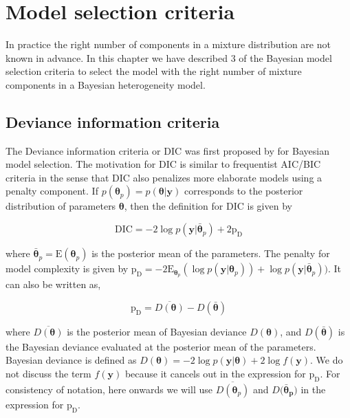 \chapter{Model selection criteria}
\label{ch : model_selection}

In practice the right number of components in a mixture distribution are not known in advance. In this chapter we have described 3 of the Bayesian model selection criteria to select the model with the right number of mixture components in a Bayesian heterogeneity model.

\section{Deviance information criteria}
\label{sec : dic}

The Deviance information criteria or DIC was first proposed by \citet{spiegelhalter_bayesian_2002} for Bayesian model selection. The motivation for DIC is similar to frequentist AIC/BIC criteria in the sense that DIC also penalizes more elaborate models using a penalty component. If $p(\boldsymbol{\theta}_p) = p(\boldsymbol{\theta}|\boldsymbol{y})$ corresponds to the posterior distribution of parameters $\boldsymbol{\theta}$, then the definition for DIC is given by 

$$\text{DIC} = -2\log{p(\boldsymbol{y}|\boldsymbol{\bar{\theta}}_p)} + 2\text{p}_\text{D}$$

where $\boldsymbol{\bar{\theta}}_p = \text{E}(\boldsymbol{\theta}_p)$ is the posterior mean of the parameters. The penalty for model complexity is given by 
$\text{p}_\text{D} = -2\text{E}_{\boldsymbol{\theta}_p}(\log{p(\boldsymbol{y}|\boldsymbol{\theta}_p)}) + \log{p(\boldsymbol{y}|\boldsymbol{\bar{\theta}}_p)})$. It can also be written as,

$$\text{p}_\text{D}=\overline{D(\boldsymbol{\theta})} - D(\boldsymbol{\bar{\theta}})$$

where $\overline{D(\boldsymbol{\theta})}$ is the posterior mean of Bayesian deviance $D(\boldsymbol{\theta})$, and $D(\boldsymbol{\bar{\theta}})$ is the Bayesian deviance evaluated at the posterior mean of the parameters. Bayesian deviance is defined as $D(\boldsymbol{\theta}) = -2\log{p(\boldsymbol{y}|\boldsymbol{\theta})} + 2\log{f(\boldsymbol{y})}$. We do not discuss the term $f(\boldsymbol{y})$ because it cancels out in the expression for $\text{p}_\text{D}$. For consistency of notation, here onwards we will use $\overline{D(\boldsymbol{\theta}_p)}$ and $D(\boldsymbol{\bar{\theta}_p)}$ in the expression for $\text{p}_\text{D}$.

